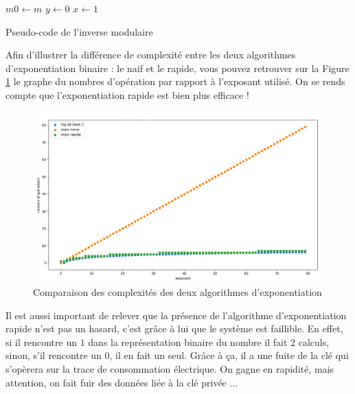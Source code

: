 \begin{algorithm}[p]
\SetAlgoLined
{}
$m0 \leftarrow m$\;
$y \leftarrow 0$\;
$x \leftarrow 1$\;
\;
\caption{Pseudo-code de l'inverse modulaire}
\label{alg:invmod}
\end{algorithm}

Afin d'illustrer la différence de complexité entre les deux algorithmes d'exponentiation binaire : le naif et le rapide, vous pouvez retrouver sur la Figure \ref{fig:diff_complexite} le graphe du nombres d'opération par rapport à l'exposant utilisé. On se rends compte que l'exponentiation rapide est bien plus efficace !
\begin{figure}[H]
    \centering
    \includegraphics[width=\textwidth]{fig/diff_complexite.png}
    \caption{Comparaison des complexités des deux algorithmes d'exponentiation}
    \label{fig:diff_complexite}
\end{figure}
Il est aussi important de relever que la présence de l'algorithme d’exponentiation rapide n'est pas un hasard, c'est grâce à lui que le système est faillible. En effet, si il rencontre un $1$ dans la représentation binaire du nombre il fait 2 calculs, sinon, s'il rencontre un $0$, il en fait un seul. Grâce à ça, il a une fuite de la clé qui s’opèrera sur la trace de consommation électrique. On gagne en rapidité, mais attention, on fait fuir des données liée à la clé privée ...\\

